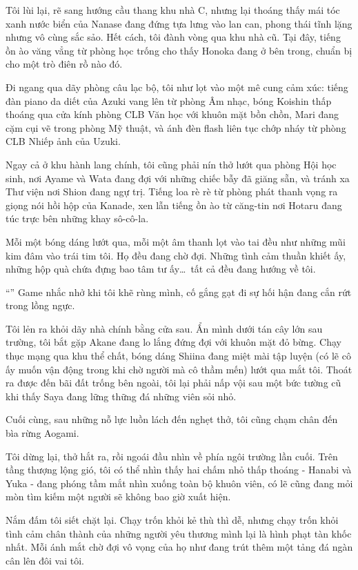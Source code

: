 \documentclass[../main.tex]{subfiles}
\begin{document}
Tôi lùi lại, rẽ sang hướng cầu thang khu nhà C, nhưng lại thoáng thấy mái tóc xanh nước biển của Nanase đang đứng tựa lưng vào lan can, phong thái tĩnh lặng nhưng vô cùng sắc sảo. Hết cách, tôi đành vòng qua khu nhà cũ. Tại đây, tiếng ồn ào văng vẳng từ phòng học trống cho thấy Honoka đang ở bên trong, chuẩn bị cho một trò điên rồ nào đó.

Đi ngang qua dãy phòng câu lạc bộ, tôi như lọt vào một mê cung cảm xúc: tiếng đàn piano da diết của Azuki vang lên từ phòng Âm nhạc, bóng Koishin thấp thoáng qua cửa kính phòng CLB Văn học với khuôn mặt bồn chồn, Mari đang cặm cụi vẽ trong phòng Mỹ thuật, và ánh đèn flash liên tục chớp nháy từ phòng CLB Nhiếp ảnh của Uzuki.

Ngay cả ở khu hành lang chính, tôi cũng phải nín thở lướt qua phòng Hội học sinh, nơi Ayame và Wata đang đợi với những chiếc bẫy đã giăng sẵn, và tránh xa Thư viện nơi Shion đang ngự trị. Tiếng loa rè rè từ phòng phát thanh vọng ra giọng nói hồi hộp của Kanade, xen lẫn tiếng ồn ào từ căng-tin nơi Hotaru đang túc trực bên những khay sô-cô-la.

Mỗi một bóng dáng lướt qua, mỗi một âm thanh lọt vào tai đều như những mũi kim đâm vào trái tim tôi. Họ đều đang chờ đợi. Những tình cảm thuần khiết ấy, những hộp quà chứa đựng bao tâm tư ấy\dots\ tất cả đều đang hướng về tôi.

``'' Game nhắc nhở khi tôi khẽ rùng mình, cố gắng gạt đi sự hối hận đang cắn rứt trong lồng ngực.

Tôi lẻn ra khỏi dãy nhà chính bằng cửa sau. Ẩn mình dưới tán cây lớn sau trường, tôi bắt gặp Akane đang lo lắng đứng đợi với khuôn mặt đỏ bừng. Chạy thục mạng qua khu thể chất, bóng dáng Shiina đang miệt mài tập luyện (có lẽ cô ấy muốn vận động trong khi chờ người mà cô thầm mến) lướt qua mắt tôi. Thoát ra được đến bãi đất trống bên ngoài, tôi lại phải nấp vội sau một bức tường cũ khi thấy Saya đang lững thững đá những viên sỏi nhỏ.

Cuối cùng, sau những nỗ lực luồn lách đến nghẹt thở, tôi cũng chạm chân đến bìa rừng Aogami.

Tôi dừng lại, thở hắt ra, rồi ngoái đầu nhìn về phía ngôi trường lần cuối. Trên tầng thượng lộng gió, tôi có thể nhìn thấy hai chấm nhỏ thấp thoáng - Hanabi và Yuka - đang phóng tầm mắt nhìn xuống toàn bộ khuôn viên, có lẽ cũng đang mỏi mòn tìm kiếm một người sẽ không bao giờ xuất hiện.

Nắm đấm tôi siết chặt lại. Chạy trốn khỏi kẻ thù thì dễ, nhưng chạy trốn khỏi tình cảm chân thành của những người yêu thương mình lại là hình phạt tàn khốc nhất. Mỗi ánh mắt chờ đợi vô vọng của họ như đang trút thêm một tảng đá ngàn cân lên đôi vai tôi.
\end{document}
